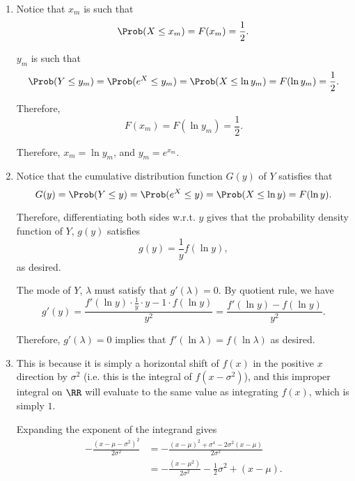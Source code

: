 \Question{\currfilebase}

\begin{enumerate}
    \item Notice that \(x_m\) is such that
          \[
              \Prob(X \leq x_m) = F(x_m) = \frac{1}{2}.
          \]

          \(y_m\) is such that
          \[
              \Prob(Y \leq y_m) = \Prob(e^X \leq y_m) = \Prob(X \leq \ln y_m) = F(\ln y_m) = \frac{1}{2}.
          \]

          Therefore,
          \[
              F(x_m) = F(\ln y_m) = \frac{1}{2}.
          \]

          Therefore, \(x_m = \ln y_m\), and \(y_m = e^{x_m}\).

    \item Notice that the cumulative distribution function \(G(y)\) of \(Y\) satisfies that
          \[
              G(y) = \Prob(Y \leq y) = \Prob(e^X \leq y) = \Prob(X \leq \ln y) = F(\ln y).
          \]

          Therefore, differentiating both sides w.r.t. \(y\) gives that the probability density function of \(Y\), \(g(y)\) satisfies
          \[
              g(y) = \frac{1}{y} f(\ln y),
          \]
          as desired.

          The mode of \(Y\), \(\lambda\) must satisfy that \(g'(\lambda) = 0\). By quotient rule, we have
          \[
              g'(y) = \frac{f'(\ln y) \cdot \frac{1}{y} \cdot y - 1 \cdot f (\ln y)}{y^2} = \frac{f'(\ln y) - f(\ln y)}{y^2}.
          \]

          Therefore, \(g'(\lambda) = 0\) implies that \(f'(\ln \lambda) = f(\ln \lambda)\) as desired.

    \item This is because it is simply a horizontal shift of \(f(x)\) in the positive \(x\) direction by \(\sigma^2\) (i.e. this is the integral of \(f(x - \sigma^2)\)), and this improper integral on \(\RR\) will evaluate to the same value as integrating \(f(x)\), which is simply \(1\).

          Expanding the exponent of the integrand gives
          \begin{align*}
              - \frac{(x - \mu - \sigma^2)^2}{2 \sigma^2} & = - \frac{(x - \mu)^2 + \sigma^4 - 2 \sigma^2 (x - \mu)}{2 \sigma^2} \\
                                                          & = -\frac{(x - \mu^2)}{2 \sigma^2} - \frac{1}{2}\sigma^2 + (x - \mu).
          \end{align*}


\end{enumerate}
